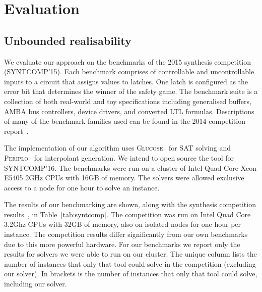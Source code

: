 \chapter{Evaluation}
\label{ch:evaluation}

\section{Unbounded realisability}

We evaluate our approach on the benchmarks of the 2015 synthesis competition
(SYNTCOMP'15). Each benchmark comprises of controllable and uncontrollable
inputs to a circuit that assigns values to latches. One latch is configured as
the error bit that determines the winner of the safety game. The benchmark
suite is a collection of both real-world and toy specifications including
generalised buffers, AMBA bus controllers, device drivers, and converted LTL
formulas.  Descriptions of many of the benchmark families used can be found in
the 2014 competition report~\cite{jacobs2015}. 

The implementation of our algorithm uses \textsc{Glucose}~\cite{audemard2014}
for SAT solving and \textsc{Periplo}~\cite{rollini2013} for interpolant
generation. We intend to open source the tool for SYNTCOMP'16. The benchmarks
were run on a cluster of Intel Quad Core Xeon E5405 2GHz CPUs with 16GB of
memory.  The solvers were allowed exclusive access to a node for one hour to
solve an instance. 

The results of our benchmarking are shown, along with the synthesis competition
results~\cite{syntcompedacc}, in Table~\ref{tab:syntcomp}. The competition was
run on Intel Quad Core 3.2Ghz CPUs with 32GB of memory, also on isolated nodes
for one hour per instance. The competition results differ significantly from
our own benchmarks due to this more powerful hardware.  For our benchmarks we
report only the results for solvers we were able to run on our cluster. The
unique column lists the number of instances that only that tool could solve in
the competition (excluding our solver). In brackets is the number of instances
that only that tool could solve, including our solver.

